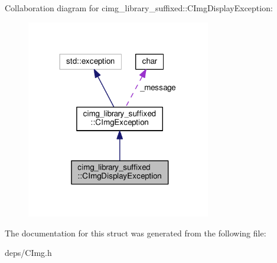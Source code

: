 Collaboration diagram for cimg\+\_\+library\+\_\+suffixed\+:\+:C\+Img\+Display\+Exception\+:
\nopagebreak
\begin{figure}[H]
\begin{center}
\leavevmode
\includegraphics[width=228pt]{d1/da9/structcimg__library__suffixed_1_1CImgDisplayException__coll__graph}
\end{center}
\end{figure}


The documentation for this struct was generated from the following file\+:\begin{DoxyCompactItemize}
\item 
deps/C\+Img.\+h\end{DoxyCompactItemize}
